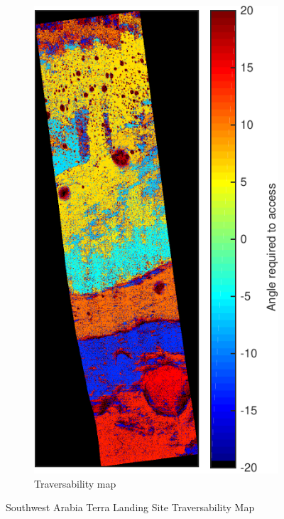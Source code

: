 \documentclass[12pt]{article}
\begin{document}
\begin{figure}[h!]
  ~
  \begin{subfigure}[t]{0.27\textwidth}
    \centering
    \includegraphics[height=0.4\paperheight]{figures/maps/ESP_011844_1855/DTEEC_011844_1855_002812_1855_A01-traversability_map.pdf}
    \caption{Traversability map}
    \label{fig:southwest_traversability}
  \end{subfigure}
  \caption{Southwest Arabia Terra Landing Site Traversability Map}
  \label{fig:southwest}
\end{figure}
\end{document}
